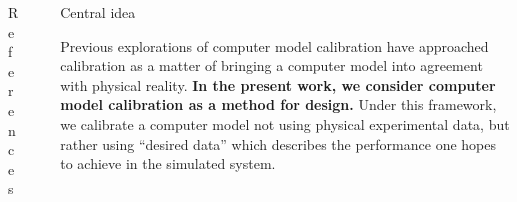 \documentclass[final]{beamer}
\newlength{\sepwid}
\newlength{\onecolwid}
\newlength{\twocolwid}
\begin{document}
\begin{frame}[t]
\begin{columns}[t]
\begin{column}{\onecolwid}
\begin{alertblock}{References}

\tiny





\end{alertblock}



%
%
%
%


\end{column} %



\begin{column}{\sepwid}\end{column} %

\begin{column}{\twocolwid} %


\begin{alertblock}{Central idea}

Previous explorations of computer model calibration have approached calibration as a matter of bringing a computer model into agreement with physical reality. \textbf{In the present work, we consider computer model calibration as a method for design.} Under this framework, we calibrate a computer model not using physical experimental data, but rather using ``desired data'' which describes the performance one hopes to achieve in the simulated system. 


\end{alertblock}
\end{column}
\end{columns}
\end{frame}
\end{document}
